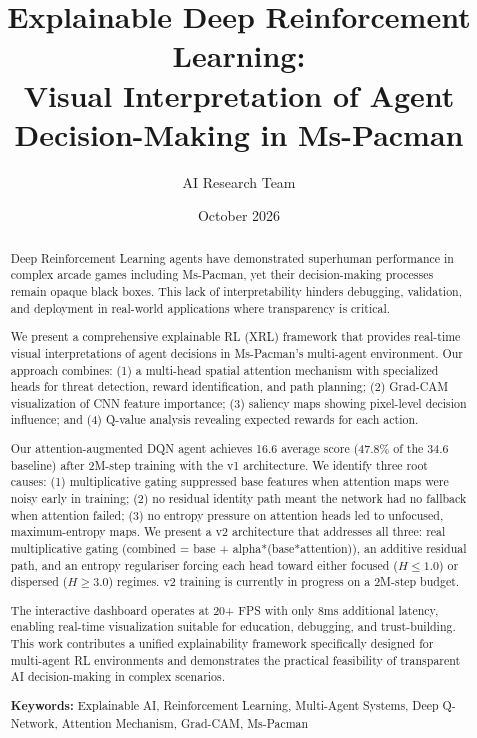 \documentclass[11pt,a4paper]{article}
\title{Explainable Deep Reinforcement Learning: \\
Visual Interpretation of Agent Decision-Making in Ms-Pacman}
\author{AI Research Team}
\affil{School of Computing}
\date{October 2026}
\begin{document}
\maketitle

\begin{abstract}

Deep Reinforcement Learning agents have demonstrated superhuman performance in complex arcade games including Ms-Pacman, yet their decision-making processes remain opaque black boxes. This lack of interpretability hinders debugging, validation, and deployment in real-world applications where transparency is critical. 

We present a comprehensive explainable RL (XRL) framework that provides real-time visual interpretations of agent decisions in Ms-Pacman's multi-agent environment. Our approach combines: (1) a multi-head spatial attention mechanism with specialized heads for threat detection, reward identification, and path planning; (2) Grad-CAM visualization of CNN feature importance; (3) saliency maps showing pixel-level decision influence; and (4) Q-value analysis revealing expected rewards for each action.

Our attention-augmented DQN agent achieves 16.6 average score (47.8\% of the 34.6 baseline) after 2M-step training with the v1 architecture. We identify three root causes: (1) multiplicative gating suppressed base features when attention maps were noisy early in training; (2) no residual identity path meant the network had no fallback when attention failed; (3) no entropy pressure on attention heads led to unfocused, maximum-entropy maps. We present a v2 architecture that addresses all three: real multiplicative gating (combined = base + alpha*(base*attention)), an additive residual path, and an entropy regulariser forcing each head toward either focused ($H\le1.0$) or dispersed ($H\ge3.0$) regimes. v2 training is currently in progress on a 2M-step budget.

The interactive dashboard operates at 20+ FPS with only 8ms additional latency, enabling real-time visualization suitable for education, debugging, and trust-building. This work contributes a unified explainability framework specifically designed for multi-agent RL environments and demonstrates the practical feasibility of transparent AI decision-making in complex scenarios.

\textbf{Keywords:} Explainable AI, Reinforcement Learning, Multi-Agent Systems, Deep Q-Network, Attention Mechanism, Grad-CAM, Ms-Pacman

\end{abstract}
\end{document}
